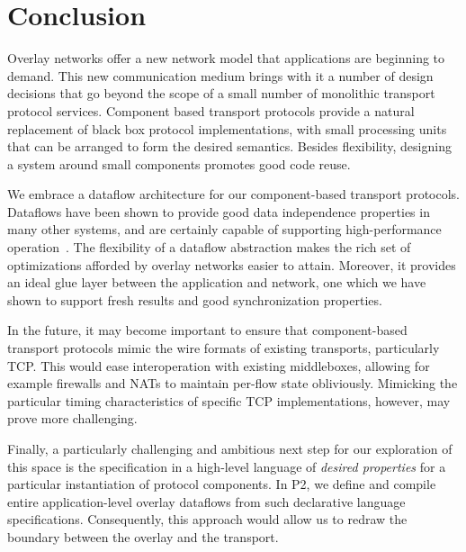 \section{Conclusion}
\label{sec:discussion}

Overlay networks offer a new network model that applications are beginning 
to demand. This new communication medium brings with it a number of design 
decisions that go beyond the scope of a small number of monolithic
transport protocol services. Component based transport protocols
provide a natural replacement of black box protocol implementations,
with small processing units that can be arranged to form the desired
semantics. Besides flexibility, designing a system around small components promotes
good code reuse.

We embrace a dataflow architecture for our component-based transport
protocols.  Dataflows have been shown to provide good
data independence properties in many other systems, and are certainly
capable of supporting high-performance
operation~\cite{BrewerInktomi}. The flexibility of a
dataflow abstraction makes the rich set of optimizations afforded by
overlay networks easier to attain. Moreover, it provides an ideal glue
layer between the application and network, one which we have shown to
support fresh results and good synchronization properties. 

In the future, it may become important to ensure that component-based
transport 
protocols mimic the wire formats of existing transports, particularly
TCP.  This would ease interoperation with existing middleboxes, allowing
for example firewalls and NATs to maintain per-flow state obliviously.
Mimicking the particular timing characteristics of specific TCP
implementations, however, may prove more challenging.

Finally, a particularly challenging and ambitious next step for our exploration of this space
is the specification in a high-level language of \emph{desired properties}
for a particular instantiation of protocol components.  In P2, we define
and compile entire
application-level overlay dataflows from such declarative language specifications.
Consequently, this approach would allow us to redraw the
boundary between the overlay and the transport.
